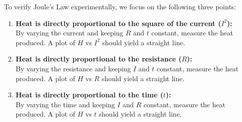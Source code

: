 \documentclass{beamer}
\begin{document}
\begin{frame}
\begin{tcolorbox}[colback=green!10!white, colframe=green!50!black, title=Verification of Joule's Law]
To verify Joule's Law experimentally, we focus on the following three points:

\begin{enumerate}
    \item \textbf{Heat is directly proportional to the square of the current (\( I^2 \)):} \\
    By varying the current and keeping \( R \) and \( t \) constant, measure the heat produced. A plot of \( H \) vs \( I^2 \) should yield a straight line.

    \item \textbf{Heat is directly proportional to the resistance (\( R \)):} \\
    By varying the resistance and keeping \( I \) and \( t \) constant, measure the heat produced. A plot of \( H \) vs \( R \) should yield a straight line.

    \item \textbf{Heat is directly proportional to the time (\( t \)):} \\
    By varying the time and keeping \( I \) and \( R \) constant, measure the heat produced. A plot of \( H \) vs \( t \) should yield a straight line.
\end{enumerate}
\end{tcolorbox}
\end{frame}


\end{document}
